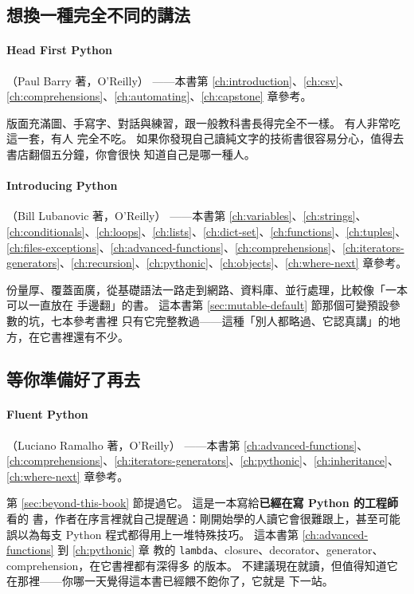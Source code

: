 \subsection*{想換一種完全不同的講法}

\paragraph{Head First Python}（Paul Barry 著，O'Reilly）
——本書第 \ref{ch:introduction}、\ref{ch:csv}、\ref{ch:comprehensions}、\ref{ch:automating}、\ref{ch:capstone} 章參考。

版面充滿圖、手寫字、對話與練習，跟一般教科書長得完全不一樣。 有人非常吃這一套，有人
完全不吃。 如果你發現自己讀純文字的技術書很容易分心，值得去書店翻個五分鐘，你會很快
知道自己是哪一種人。

\paragraph{Introducing Python}（Bill Lubanovic 著，O'Reilly）
——本書第 \ref{ch:variables}、\ref{ch:strings}、\ref{ch:conditionals}、\ref{ch:loops}、\ref{ch:lists}、\ref{ch:dict-set}、\ref{ch:functions}、\ref{ch:tuples}、\ref{ch:files-exceptions}、\ref{ch:advanced-functions}、\ref{ch:comprehensions}、\ref{ch:iterators-generators}、\ref{ch:recursion}、\ref{ch:pythonic}、\ref{ch:objects}、\ref{ch:where-next} 章參考。

份量厚、覆蓋面廣，從基礎語法一路走到網路、資料庫、並行處理，比較像「一本可以一直放在
手邊翻」的書。 這本書第 \ref{sec:mutable-default} 節那個可變預設參數的坑，七本參考書裡
只有它完整教過——這種「別人都略過、它認真講」的地方，在它書裡還有不少。

\subsection*{等你準備好了再去}

\paragraph{Fluent Python}（Luciano Ramalho 著，O'Reilly）
——本書第 \ref{ch:advanced-functions}、\ref{ch:comprehensions}、\ref{ch:iterators-generators}、\ref{ch:pythonic}、\ref{ch:inheritance}、\ref{ch:where-next} 章參考。

第 \ref{sec:beyond-this-book} 節提過它。 這是一本寫給\textbf{已經在寫 Python 的工程師}看的
書，作者在序言裡就自己提醒過：剛開始學的人讀它會很難跟上，甚至可能誤以為每支 Python
程式都得用上一堆特殊技巧。 這本書第 \ref{ch:advanced-functions} 到 \ref{ch:pythonic} 章
教的 \texttt{lambda}、closure、decorator、generator、comprehension，在它書裡都有深得多
的版本。 不建議現在就讀，但值得知道它在那裡——你哪一天覺得這本書已經餵不飽你了，它就是
下一站。

